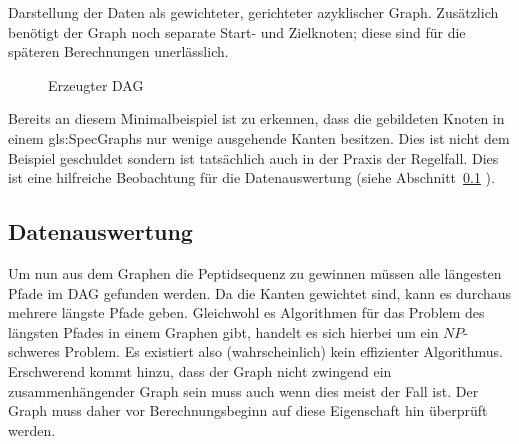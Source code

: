\documentclass[a4paper, 12pt]{article}
\newcommand{\gerquot}[1]{\glqq#1\grqq}
\newcommand{\dashAndSpace}{\textendash \space}
\begin{document}
Darstellung der Daten als gewichteter, gerichteter azyklischer Graph. Zusätzlich benötigt der Graph noch separate Start- und Zielknoten; diese sind für die späteren Berechnungen unerlässlich.

\newcommand{\printVertices}[2]%
{%
   \Vertex[x=-8,y=0]{Start}
   \Vertex[x=8,y=0]{End}
   \foreach \x [count=\xi] in {#1}
   {%
      \foreach \y [count=\yi] in {#2}
      {%
         \ifthenelse{\xi=\yi}{
         \tikzstyle{VertexStyle}=[shape=circle,fill=\y,draw=black,line width=0.75pt]
         \Vertex[x=-7+\xi*2,y=0]{\x}}{\break}
      }
   }
}
\begin{figure}[htb]
   \centering
   \caption{Erzeugter DAG}
\end{figure}

Bereits an diesem Minimalbeispiel ist zu erkennen, dass die gebildeten Knoten in einem \glspl{gls:SpecGraph} nur wenige ausgehende Kanten besitzen. Dies ist nicht dem Beispiel geschuldet sondern ist tatsächlich auch in der Praxis der Regelfall. Dies ist eine hilfreiche Beobachtung für die Datenauswertung (siehe Abschnitt~\ref{Datenauswertung} \gerquot{}).


\subsection{Datenauswertung}\label{Datenauswertung}
Um nun aus dem Graphen die Peptidsequenz zu gewinnen müssen alle längesten Pfade im DAG gefunden werden. Da die Kanten gewichtet sind, kann es durchaus mehrere längste Pfade geben. Gleichwohl es Algorithmen für das Problem des längsten Pfades in einem Graphen gibt, handelt es sich hierbei um ein $NP$-schweres Problem. Es existiert also (wahrscheinlich) kein effizienter Algorithmus. Erschwerend kommt hinzu, dass der Graph nicht zwingend ein zusammenhängender Graph sein muss \dashAndSpace auch wenn dies meist der Fall ist. Der Graph muss daher vor Berechnungsbeginn auf diese Eigenschaft hin überprüft werden.
\end{document}
